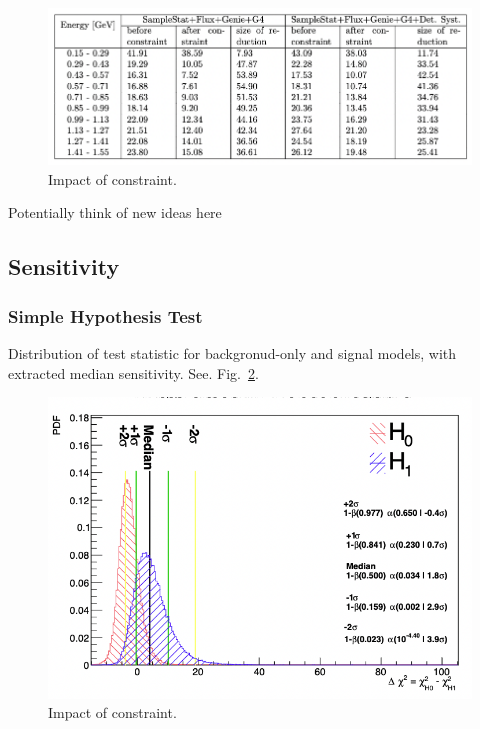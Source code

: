 \begin{center}
\begin{figure}
    \includegraphics[width=1.00\textwidth]{technote/SystematicsSensitivity/Figures/constrainttable.png}
    \caption{Impact of constraint.}
    \label{fig:constraint} 
\end{figure}
\end{center}

Potentially think of new ideas here

\newpage
\subsection{Sensitivity}
\label{sec:sensitivity}

\subsubsection{Simple Hypothesis Test}

Distribution of test statistic for backgronud-only and signal models, with extracted median sensitivity. See. Fig.~\ref{fig:simplehypothesis}.

\begin{center}
\begin{figure}[h]
    \includegraphics[width=1.00\textwidth]{technote/SystematicsSensitivity/Figures/simplehypothesis.png}
    \caption{Impact of constraint.}
    \label{fig:simplehypothesis} 
\end{figure}
\end{center}

